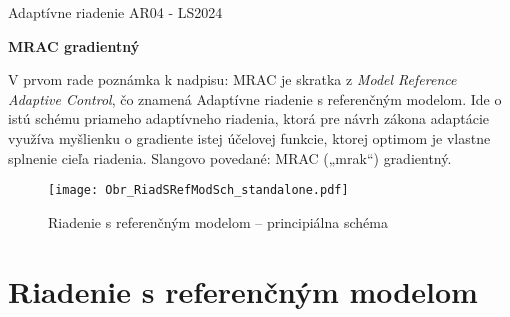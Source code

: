 \documentclass[a4paper, 10pt, ]{article}
\def\oznacenieCasti{AR04 - LS2024}
\begin{document}
\lstset{%
style=mystyle,
rangebeginprefix=\#\#\#\ cellB\ ,%
rangebeginsuffix=\ \#\#\#,%
rangeendprefix=\#\#\#\ cellE\ ,%
rangeendsuffix=\ \#\#\#,%
includerangemarker=false,
}





\fontsize{12pt}{22pt}\selectfont

\centerline{\textsf{Adaptívne riadenie} \hfill \textsf{\oznacenieCasti}}

\fontsize{18pt}{22pt}\selectfont





\begin{flushleft}
	\textbf{\textsf{MRAC gradientný}}
\end{flushleft}





\normalsize

\bigskip

{\hypersetup{hidelinks}

\tableofcontents

}

\bigskip

\vspace{18pt}






\noindent
V prvom rade poznámka k nadpisu: MRAC je skratka z \emph{Model Reference Adaptive Control}, čo znamená Adaptívne riadenie s referenčným modelom. Ide o istú schému priameho adaptívneho riadenia, ktorá pre návrh zákona adaptácie využíva myšlienku o gradiente istej účelovej funkcie, ktorej optimom je vlastne splnenie cieľa riadenia. Slangovo povedané: MRAC („mrak“) gradientný.








\begin{figure}[!b]
\centering

	\texttt{[image: Obr\_RiadSRefModSch\_standalone.pdf]}

	\caption{Riadenie s referenčným modelom -- principiálna schéma}
	\label{Riadenie s referenčným modelom --- principiálna schéma}

\end{figure}





\section{Riadenie s referenčným modelom}
\end{document}
